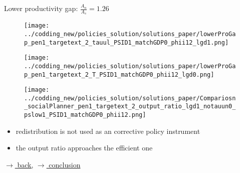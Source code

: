 \documentclass[11pt,aspectratio=169]{beamer}
\begin{document}
	
	\begin{frame}{Lower productivity gap: $\frac{A_n}{A_s}=1.26$}
		\begin{figure}
			\begin{minipage}[]{0.32\textwidth}
				\texttt{[image: ../codding\_new/policies\_solution/solutions\_paper/lowerProGap\_pen1\_targetext\_2\_tauul\_PSID1\_matchGDP0\_phii12\_lgd1.png]}
			\end{minipage}
			\begin{minipage}[]{0.32\textwidth}
				\texttt{[image: ../codding\_new/policies\_solution/solutions\_paper/lowerProGap\_pen1\_targetext\_2\_T\_PSID1\_matchGDP0\_phii12\_lgd0.png]}
			\end{minipage}  
			\begin{minipage}[]{0.32\textwidth}
				\texttt{[image: ../codding\_new/policies\_solution/solutions\_paper/Compariosn\_socialPlanner\_pen1\_targetext\_2\_output\_ratio\_lgd1\_notauun0\_pslow1\_PSID1\_matchGDP0\_phii12.png]}
			\end{minipage}  
		\end{figure}
		\begin{itemize}
			\item  redistribution is not used as an corrective policy instrument%
			\item the output ratio approaches the efficient one
		\end{itemize}
		\vspace{-1mm}
		\hfill 
		\hyperlink{backpe}{\tiny{$\rightarrow$ back,}}	
		\hyperlink{conc}{\tiny{$\rightarrow$ conclusion}}	
	\end{frame}
	
\end{document}
